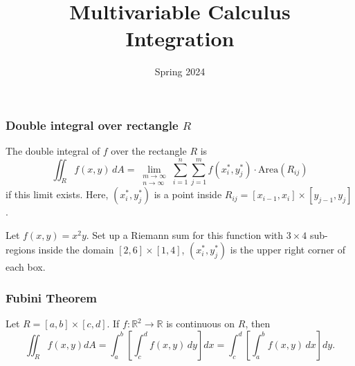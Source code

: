 \documentclass[aspectratio=169]{beamer}
\title{ Multivariable Calculus \\ Integration }
\date{Spring 2024}
\newcommand{\R}{\mathbb{R}}
\begin{document}
\maketitle

\begin{frame}
    \frametitle{Double integral over rectangle $R$}
    \begin{definition}
        The double integral of $f$ over the rectangle $R$ is
        \[
        \iint_R f(x, y) \, dA = 
        \lim_{\substack{m\to\infty\\ n\to \infty}} 
        \sum_{i=1}^n \sum_{j=1}^m f(x^*_i, y^*_j)\cdot \mathrm{Area}(R_{ij})
        \]
if this limit exists.
Here, $(x^*_i, y^*_j)$ is a point inside $R_{ij} = [x_{i-1},x_i]\times [y_{j-1}, y_j]$.
    \end{definition}
\end{frame}



\begin{frame}
    Let $f (x,y) = x^2 y$.
    Set up a Riemann sum for this function with $3\times 4$ sub-regions inside the domain
    $[2,6]\times [1,4]$, $(x^*_i, y^*_j)$ is the upper right corner of each box. 
\end{frame}
\begin{frame}
    \frametitle{Fubini Theorem}
    Let $R = [a,b]\times [c,d]$. 
    If $f:\R^2 \to \R$ is continuous on $R$, then
    $$ \iint_R f(x,y) dA = \int_a^b \left[ \int_c^d f(x,y) \, dy \right] dx =
     \int_c^d \left[ \int_a^b f(x,y) \, dx \right] dy.$$
\end{frame}
\end{document}
